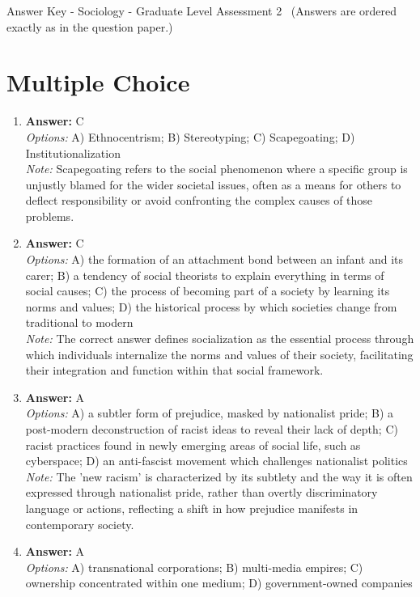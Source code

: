 \documentclass[12pt]{article}
\begin{document}
\begin{center}
Answer Key - Sociology - Graduate Level Assessment 2 \
\small (Answers are ordered exactly as in the question paper.)
\end{center}

\section*{Multiple Choice}
\begin{enumerate}[label=\arabic*.]
\item \textbf{Answer:} C
\\ \textit{Options:} A) Ethnocentrism; B) Stereotyping; C) Scapegoating; D) Institutionalization
\\ \textit{Note:} Scapegoating refers to the social phenomenon where a specific group is unjustly blamed for the wider societal issues, often as a means for others to deflect responsibility or avoid confronting the complex causes of those problems.
\item \textbf{Answer:} C
\\ \textit{Options:} A) the formation of an attachment bond between an infant and its carer; B) a tendency of social theorists to explain everything in terms of social causes; C) the process of becoming part of a society by learning its norms and values; D) the historical process by which societies change from traditional to modern
\\ \textit{Note:} The correct answer defines socialization as the essential process through which individuals internalize the norms and values of their society, facilitating their integration and function within that social framework.
\item \textbf{Answer:} A
\\ \textit{Options:} A) a subtler form of prejudice, masked by nationalist pride; B) a post-modern deconstruction of racist ideas to reveal their lack of depth; C) racist practices found in newly emerging areas of social life, such as cyberspace; D) an anti-fascist movement which challenges nationalist politics
\\ \textit{Note:} The 'new racism' is characterized by its subtlety and the way it is often expressed through nationalist pride, rather than overtly discriminatory language or actions, reflecting a shift in how prejudice manifests in contemporary society.
\item \textbf{Answer:} A
\\ \textit{Options:} A) transnational corporations; B) multi-media empires; C) ownership concentrated within one medium; D) government-owned companies

\end{enumerate}
\end{document}
